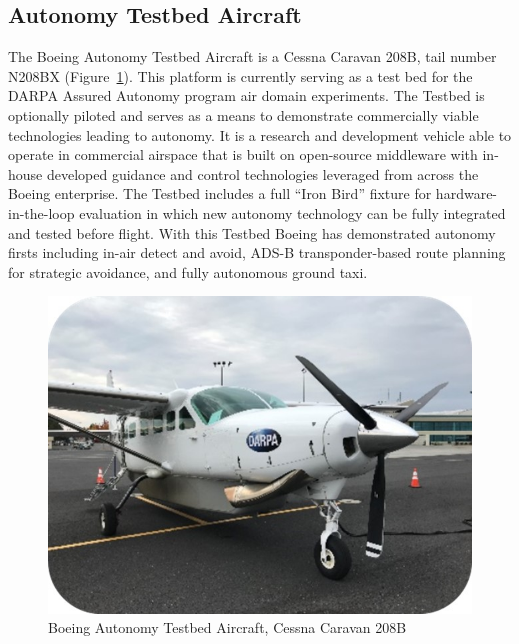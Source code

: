\subsection{Autonomy Testbed Aircraft}





The Boeing Autonomy Testbed Aircraft is a Cessna Caravan 208B, tail number N208BX (Figure~\ref{fig:caravan}).  This platform is currently serving as a test bed for the DARPA Assured Autonomy program air domain experiments.  The Testbed is optionally piloted and serves as a means to demonstrate commercially viable technologies leading to autonomy.  It is a research and development vehicle able to operate in commercial airspace that is built on open-source middleware with in-house developed guidance and control technologies leveraged from across the Boeing enterprise.  The Testbed includes a full ``Iron Bird'' fixture for hardware-in-the-loop evaluation in which new autonomy technology can be fully integrated and tested before flight.  With this Testbed Boeing has demonstrated autonomy firsts including in-air detect and avoid, ADS-B transponder-based route planning for strategic avoidance, and fully autonomous ground taxi.

\begin{figure}
	\centering
	\includegraphics[width=\columnwidth]{figures/caravan.jpg}
	\caption{Boeing Autonomy Testbed Aircraft, Cessna Caravan 208B}
	\label{fig:caravan}
\end{figure}

